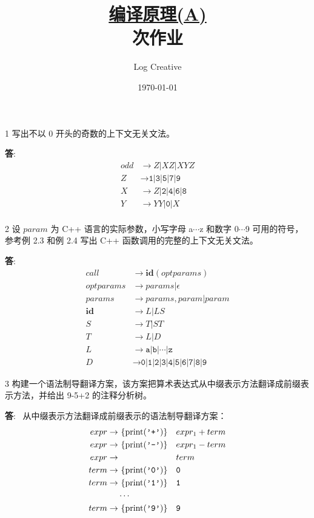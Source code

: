 \documentclass[12pt,a4paper]{article}
\newenvironment{problems}{\begin{list}{}{\renewcommand{\makelabel}[1]{\textbf{##1}\hfil}}}{\end{list}}
\providecommand{\ans}{\textbf{答}:~}
\begin{document}
\title{\normalsize \underline{编译原理(A)}\\ 次作业}
\author{Log Creative }
\date{\today}
\maketitle

\begin{problems}
    \item[1] 写出不以 0 开头的奇数的上下文无关文法。
    
    \ans 
    \begin{align*}
        odd &\rightarrow  Z|XZ|XYZ \\
        Z &\rightarrow \texttt{1|3|5|7|9}\\
        X &\rightarrow Z|\texttt{2|4|6|8}\\
        Y &\rightarrow YY\texttt{|0|}X\\
    \end{align*}
    \item[2] 设 $param$ 为 C++ 语言的实际参数，小写字母 a$\cdots$z 和数字 0$\cdots$9 可用的符号，参考例 2.3 和例 2.4 写出 C++ 函数调用的完整的上下文无关文法。
    
    \ans 
    \begin{align*}
        call &\rightarrow \textbf{id}(optparams)\\
        optparams &\rightarrow params | \epsilon \\
        params &\rightarrow params, param | param\\
        \textbf{id} &\rightarrow L|LS\\
        S &\rightarrow T|ST\\
        T &\rightarrow L|D\\
        L &\rightarrow \texttt{a|b|}\cdots\texttt{|z}\\
        D &\rightarrow \texttt{0|1|2|3|4|5|6|7|8|9}
    \end{align*}
    \item[3] 构建一个语法制导翻译方案，该方案把算术表达式从中缀表示方法翻译成前缀表示方法，并给出 9-5+2 的注释分析树。
    
    \ans 
    从中缀表示方法翻译成前缀表示的语法制导翻译方案：
    \begin{align*}
        expr \rightarrow& \text{ \{print(\texttt{'+'})\}}  &&expr_1 + term \\
        expr \rightarrow& \text{ \{print(\texttt{'-'})\}}  &&expr_1 - term \\
        expr \rightarrow& && term \\      
        term \rightarrow& \text{ \{print(\texttt{'0'})\}}  && \texttt{0}\\
        term \rightarrow& \text{ \{print(\texttt{'1'})\}}  && \texttt{1}\\
                        & \cdots  && \\
        term \rightarrow& \text{ \{print(\texttt{'9'})\}}  && \texttt{9}\\
    \end{align*}


\end{problems}
\end{document}
